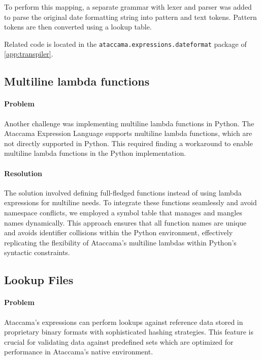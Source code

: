 To perform this mapping, a separate grammar with lexer and parser was added to parse the original date formatting string into pattern and text tokens. Pattern tokens are then converted using a lookup table.

Related code is located in the \texttt{ataccama.expressions.dateformat} package of \ref{app:transpiler}. 

\subsection{Multiline lambda functions}

\paragraph{Problem}

Another challenge was implementing multiline lambda functions in Python. The Ataccama Expression Language supports multiline lambda functions, which are not directly supported in Python\cite{pythonlambdas}. This required finding a workaround to enable multiline lambda functions in the Python implementation.

\paragraph{Resolution}

The solution involved defining full-fledged functions instead of using lambda expressions for multiline needs. To integrate these functions seamlessly and avoid namespace conflicts, we employed a symbol table that manages and mangles names dynamically. This approach ensures that all function names are unique and avoids identifier collisions within the Python environment, effectively replicating the flexibility of Ataccama's multiline lambdas within Python's syntactic constraints.
\subsection{Lookup Files}
\paragraph{Problem}

Ataccama's expressions can perform lookups against reference data stored in proprietary binary formats with sophisticated hashing strategies. This feature is crucial for validating data against predefined sets which are optimized for performance in Ataccama's native environment.
